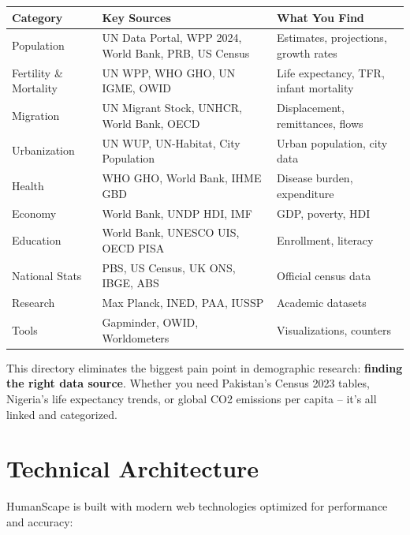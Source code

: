 \documentclass[12pt,a4paper]{article}
\begin{document}
\begin{center}
\begin{tabular}{lll}
\toprule
\textbf{Category} & \textbf{Key Sources} & \textbf{What You Find} \\
\midrule
Population & UN Data Portal, WPP 2024, World Bank, PRB, US Census & Estimates, projections, growth rates \\
Fertility \& Mortality & UN WPP, WHO GHO, UN IGME, OWID & Life expectancy, TFR, infant mortality \\
Migration & UN Migrant Stock, UNHCR, World Bank, OECD & Displacement, remittances, flows \\
Urbanization & UN WUP, UN-Habitat, City Population & Urban population, city data \\
Health & WHO GHO, World Bank, IHME GBD & Disease burden, expenditure \\
Economy & World Bank, UNDP HDI, IMF & GDP, poverty, HDI \\
Education & World Bank, UNESCO UIS, OECD PISA & Enrollment, literacy \\
National Stats & PBS, US Census, UK ONS, IBGE, ABS & Official census data \\
Research & Max Planck, INED, PAA, IUSSP & Academic datasets \\
Tools & Gapminder, OWID, Worldometers & Visualizations, counters \\
\bottomrule
\end{tabular}
\end{center}

This directory eliminates the biggest pain point in demographic research:
\textbf{finding the right data source}. Whether you need Pakistan's Census 2023
tables, Nigeria's life expectancy trends, or global CO2 emissions per capita --
it's all linked and categorized.

\section{Technical Architecture}

HumanScape is built with modern web technologies optimized for performance and accuracy:
\end{document}
